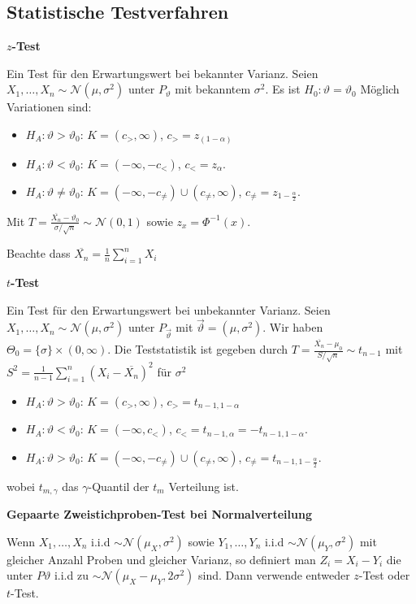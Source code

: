 \documentclass[25pt]{sciposter}
\newenvironment{method}[1]{\begin{mdframed}[backgroundcolor=blue!10,innertopmargin=15pt, innerbottommargin=15pt,nobreak=true]
		\textbf{#1 }
	}
	{ 
	\end{mdframed}
}
\begin{document}
\begin{multicols}{3}
\subsection*{Statistische Testverfahren}


\begin{method}{$z$-Test}
	Ein Test für den Erwartungswert bei bekannter Varianz. Seien $X_1,\ldots,X_n\sim \mathcal{N}(\mu,\sigma^2)$ unter $P_{\vartheta}$ mit bekanntem $\sigma^2$. Es ist $H_0 : \vartheta = \vartheta_0$ Möglich Variationen sind:
	\begin{itemize}
		\item $H_A: \vartheta > \vartheta_0$: $K = (c_>,\infty)$, $c_> = z_{(1-\alpha)}$
		\item $H_A: \vartheta < \vartheta_0$: $K = (-\infty,-c_<)$, $c_< = z_\alpha$.
		\item $H_A: \vartheta \neq \vartheta_0$: $K = (-\infty,-c_{\neq}) \cup (c_{\neq},\infty)$, $c_{\neq} = z_{1-\frac{\alpha}{2}}$.
	\end{itemize}
Mit $T=\frac{\overline{X_n}-\vartheta_0}{\sigma / \sqrt{n}} \sim \mathcal{N}(0,1)$ sowie $z_{x} = \Phi^{-1}(x)$.
\end{method}
Beachte dass $\overline{X_n} = \frac{1}{n} \sum_{i=1}^{n} X_i$

\begin{method}{$t$-Test}
	Ein Test für den Erwartungswert bei unbekannter Varianz. Seien $X_1,\ldots,X_n\sim \mathcal{N}(\mu,\sigma^2)$ unter $P_{\vec{\vartheta}}$ mit $\vec{\vartheta}=(\mu,\sigma^2)$. Wir haben $\Theta_0= \{\sigma\}\times(0,\infty)$. Die Teststatistik ist gegeben durch $T = \frac{\overline{X_n}- \mu_0}{S/\sqrt{n}} \sim t_{n-1}$ mit $S^2=\frac{1}{n-1}\sum_{i=1}^{n}\left(X_i-\overline{X_n}\right)^2$ für $\sigma^2$
	
	\begin{itemize}
		\item $H_A: \vartheta > \vartheta_0$: $K = (c_>,\infty)$, $c_> = t_{n-1,1-\alpha}$
		\item $H_A: \vartheta < \vartheta_0$: $K = (-\infty,c_<)$, $c_< = t_{n-1,\alpha} = -t_{n-1,1-\alpha}$.
		\item $H_A: \vartheta > \vartheta_0$: $K = (-\infty,-c_{\neq}) \cup (c_{\neq},\infty)$, $c_{\neq} = t_{n-1,1-\frac{\alpha}{2}}$.
	\end{itemize}
	wobei $t_{m,\gamma}$ das $\gamma$-Quantil der $t_m$ Verteilung ist.
\end{method}

\begin{method}{Gepaarte Zweistichproben-Test bei Normalverteilung}
	Wenn $X_1,\ldots,X_n$ i.i.d $\sim \mathcal{N}(\mu_X,\sigma^2)$ sowie $Y_1,\ldots,Y_n$ i.i.d $\sim \mathcal{N}(\mu_Y,\sigma^2)$ mit gleicher Anzahl Proben und gleicher Varianz, so definiert man $Z_i = X_i-Y_i$ die unter $P\vartheta$ i.i.d zu $\sim \mathcal{N}(\mu_X-\mu_Y,2\sigma^2)$ sind. Dann verwende entweder $z$-Test oder $t$-Test.
\end{method}



\end{multicols}
\end{document}
